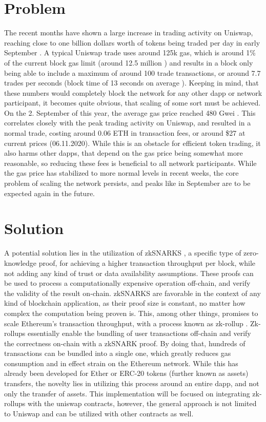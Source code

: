 \documentclass[runningheads]{llncs}
\begin{document}
\section{Problem}
The recent months have shown a large increase in trading activity on Uniswap, reaching close to one billion dollars worth of tokens being traded per day in early September \cite{uniswap_info}. A typical Uniswap trade uses around 125k gas, which is around 1\% of the current block gas limit (around 12.5 million \cite{gaslimit}) and results in a block only being able to include a maximum of around 100 trade transactions, or around 7.7 trades per seconds (block time of 13 seconds on average \cite{blocktime}). Keeping in mind, that these numbers would completely block the network for any other dapp or network participant, it becomes quite obvious, that scaling of some sort must be achieved. On the 2. September of this year, the average gas price reached 480 Gwei \cite{gasprice}. This correlates closely with the peak trading activity on Uniswap, and resulted in a normal trade, costing around 0.06 ETH in transaction fees, or around \$27 at current prices (06.11.2020). While this is an obstacle for efficient token trading, it also harms other dapps, that depend on the gas price being somewhat more reasonable, so reducing these fees is beneficial to all network participants. While the gas price has stabilized to more normal levels in recent weeks, the core problem of scaling the network persists, and peaks like in September are to be expected again in the future.

\section{Solution}
A potential solution lies in the utilization of zkSNARKS \cite{zksnarks_nutshell_2016}, a specific type of zero-knowledge proof, for achieving a higher transaction throughput per block, while not adding any kind of trust or data availability assumptions. These proofs can be used to process a computationally expensive operation off-chain, and verify the validity of the result on-chain.  zkSNARKS are favorable in the context of any kind of blockchain application, as their proof size is constant, no matter how complex the computation being proven is. This, among other things, promises to scale Ethereum's transaction throughput, with a process known as zk-rollup \cite{vbuterin_2018}. Zk-rollups essentially enable the bundling of user transactions off-chain and verify the correctness on-chain with a zkSNARK proof. By doing that, hundreds of transactions can be bundled into a single one, which greatly reduces gas consumption and in effect strain on the Ethereum network. While this has already been developed for Ether or ERC-20 tokens (further known as assets) transfers, the novelty lies in utilizing this process around an entire dapp, and not only the transfer of assets. This implementation will be focused on integrating zk-rollups with the uniswap contracts, however, the general approach is not limited to Uniswap and can be utilized with other contracts as well.
\end{document}
